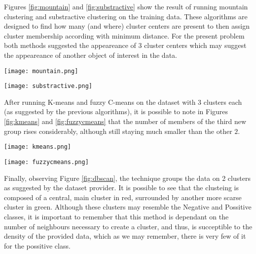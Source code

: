 Figures \ref{fig:mountain} and \ref{fig:substractive} show the result of running
mountain clustering and substractive clustering on the training data. These
algorithms are designed to find how many (and where) cluster centers are
present to then assign cluster membership according with minimum
distance. For the present problem both methods suggested the appeareance of 3
cluster centers which may suggest the appeareance of another object of interest
in the data.

\begin{figure*}[ht]
    \texttt{[image: mountain.png]}
    \caption{Cluster centers and membership using mountain clustering
    \label{fig:mountain}}
\end{figure*}
\begin{figure*}[ht]
    \texttt{[image: substractive.png]}
    \caption{Cluster centers and membership using substractive clustering
    \label{fig:substractive}}
\end{figure*}

After running K-means and fuzzy C-means on the dataset with $3$ clusters each
(as suggested by the previous algorithms), it is possible to note in Figures
\ref{fig:kmeans} and \ref{fig:fuzzycmeans} that the number of members of the
third new group rises considerably, although still staying much smaller than the
other $2$.

\begin{figure*}[ht]
    \texttt{[image: kmeans.png]}
    \caption{Cluster centers and membership using K-means with K=3
    \label{fig:kmeans}}
\end{figure*}
\begin{figure*}[ht]
    \texttt{[image: fuzzycmeans.png]}
    \caption{Cluster centers and membership using Fuzzy C-means with C=3 
    \label{fig:fuzzycmeans}}
\end{figure*}

Finally, observing Figure \ref{fig:dbscan}, the technique groups the data on 2
clusters as suggested by the dataset provider. It is possible to see that the
clusteing is composed of a central, main cluster in red, surrounded by another
more scarse cluster in green. Although these clusters may resemble the Negative
and Possitive classes, it is important to remember that this method is dependant
on the number of neighbours necessary to create a cluster, and thus, is
succeptible to the density of the provided data, which as we may remember, there
is very few of it for the possitive class.

